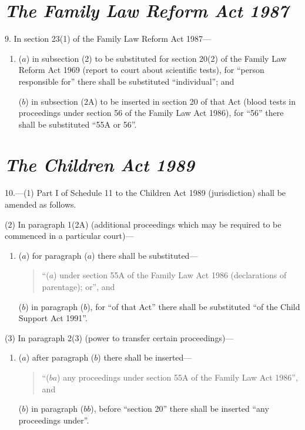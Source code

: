 \documentclass[12pt,a4paper]{article}
\begin{document}
\section*{\itshape The Family Law Reform Act 1987}

9. In section 23(1)  of the Family Law Reform Act 1987—
\begin{enumerate}\item[]
($a$) in subsection (2)  to be substituted for section 20(2)  of the Family Law Reform Act 1969 (report to court about scientific tests), for “person responsible for” there shall be substituted “individual”; and

($b$) in subsection (2A)  to be inserted in section 20 of that Act (blood tests in proceedings under section 56 of the Family Law Act 1986), for “56” there shall be substituted “55A or 56”.
\end{enumerate}

\section*{\itshape The Children Act 1989}

10.---(1) Part I of Schedule 11 to the Children Act 1989 (jurisdiction) shall be amended as follows.

(2) In paragraph 1(2A)  (additional proceedings which may be required to be commenced in a particular court)—
\begin{enumerate}\item[]
($a$) for paragraph ($a$)  there shall be substituted—
\begin{quotation}
“($a$) under section 55A of the Family Law Act 1986 (declarations of parentage); or”, and
\end{quotation}

($b$) in paragraph ($b$), for “of that Act” there shall be substituted “of the Child Support Act 1991”.
\end{enumerate}

(3) In paragraph 2(3)  (power to transfer certain proceedings)—
\begin{enumerate}\item[]
($a$) after paragraph ($b$)  there shall be inserted—
\begin{quotation}
“($ba$) any proceedings under section 55A of the Family Law Act 1986”, and
\end{quotation}

($b$) in paragraph ($bb$), before “section 20” there shall be inserted “any proceedings under”.
\end{enumerate}
\end{document}
